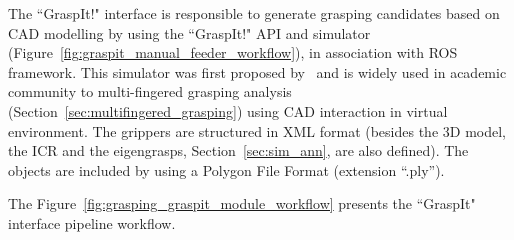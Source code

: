 The ``GraspIt!" interface is responsible to generate grasping candidates based on CAD modelling by using the ``GraspIt!" API and simulator (Figure~\ref{fig:graspit_manual_feeder_workflow}), in association with \ac{ROS} framework. This simulator was first proposed by~\cite{miller2004graspit} and is widely used in academic community to multi-fingered grasping analysis (Section~\ref{sec:multifingered_grasping}) using CAD interaction in virtual environment. The grippers are structured in XML format (besides the 3D model, the \ac{ICR} and the eigengrasps, Section~\ref{sec:sim_ann}, are also defined). The objects are included by using a Polygon File Format (extension ``.ply'').

\begin{figure}[h!]
\end{figure}

The Figure~\ref{fig:grasping_graspit_module_workflow} presents the ``GraspIt" interface pipeline workflow.

